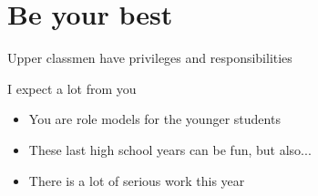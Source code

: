 \documentclass[onlytextwidth]{beamer}
\begin{document}
\section{Be your best}
\begin{frame}{Upper classmen have privileges and responsibilities}
  \begin{block}{I expect a lot from you}
    \begin{itemize}
      \item You are role models for the younger students
      \item These last high school years can be fun, but also...
      \item There is a lot of serious work this year
    \end{itemize}
    \end{block}
  \end{frame}
\end{document}
